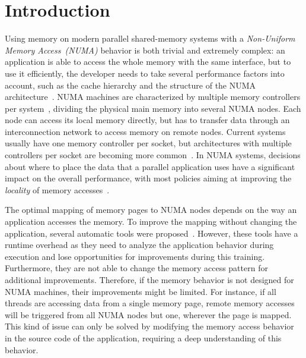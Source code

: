 
\section{Introduction}
\label{sec:intro}

Using memory on modern parallel shared-memory systems with a \emph{Non-Uniform Memory Access~(NUMA)} behavior is both trivial and extremely complex: an application is able to access the whole memory with the same interface, but to use it efficiently, the developer needs to take several performance factors into account, such as the cache hierarchy and the structure of the NUMA architecture~\cite{Drepper07What}.
NUMA machines are characterized by multiple memory controllers per system~\cite{Awasthi2010}, dividing the physical main memory into several NUMA nodes.
Each node can access its local memory directly, but has to transfer data
through an interconnection network to access memory on remote nodes.
Current systems usually have one memory controller per socket, but architectures with multiple controllers per socket are becoming more common~\cite{AMD2012}.
In NUMA systems, decisions about where to place the data that a parallel
application uses have a significant impact on the overall performance, with
most policies aiming at improving the \emph{locality} of memory accesses~\cite{Diener2015}.

The optimal mapping of memory pages to NUMA nodes depends on the way an application accesses the memory.
To improve the mapping without changing the application, several automatic tools were proposed~\cite{Corbet,Dashti2013,Diener2014,Piccoli2014}.
However, these tools have a runtime overhead as they need to analyze the application behavior during execution and lose opportunities for improvements during this training.
Furthermore, they are not able to change the memory access pattern for additional improvements.
Therefore, if the memory behavior is not designed for NUMA machines, their improvements might be limited.
For instance, if all threads are accessing data from a single memory
page, remote memory accesses will be triggered from all NUMA nodes but one,
wherever the page is mapped.
This kind of issue can only be solved by modifying the memory access behavior
in the source code of the application, requiring a deep understanding of this behavior.

